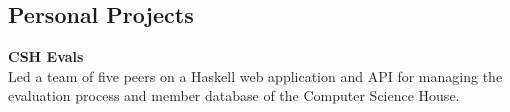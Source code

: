 \documentclass[letter,margin,line]{resume}
\newcommand{\project}[2]{\item {\bf #1}\\{\small #2}}
\begin{document}
\begin{resume}
        \section{\mysidestyle Personal Projects}
        \begin{asparablank}
            \project{CSH Evals}
            {
                Led a team of five peers on a Haskell web application
                and API for managing the evaluation process and member database
                of the Computer Science House.
            }\\
        \end{asparablank}

    \end{resume}
    
\end{document}
